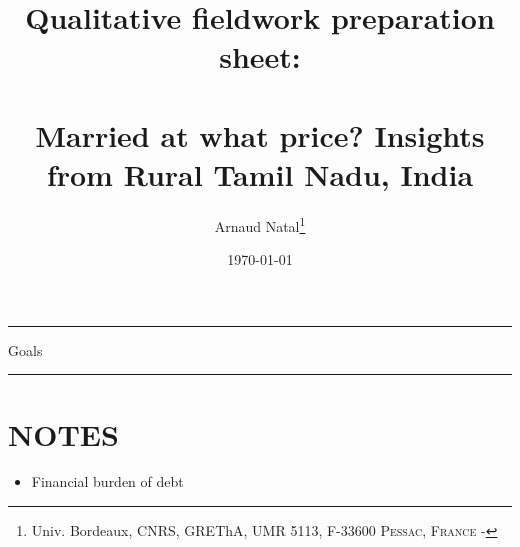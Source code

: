 \documentclass[a4paper, 11pt, onecolumn]{article}
\title{Qualitative fieldwork preparation sheet: \\ ~ \\ Married at what price? Insights from Rural Tamil Nadu, India}
\author{Arnaud Natal\thanks{Univ. Bordeaux, CNRS, GREThA, UMR 5113, F-33600 \textsc{Pessac, France} - \email{arnaud.natal@u-bordeaux.fr}}}
\date{\today}
\begin{document}
\maketitle

\hrule 
\vspace{0.3cm}

\begin{resab}{Goals}

\end{resab}



\hrule


\section{NOTES}

\begin{itemize}[leftmargin=*]
\item Financial burden of debt
\end{itemize}
\end{document}
